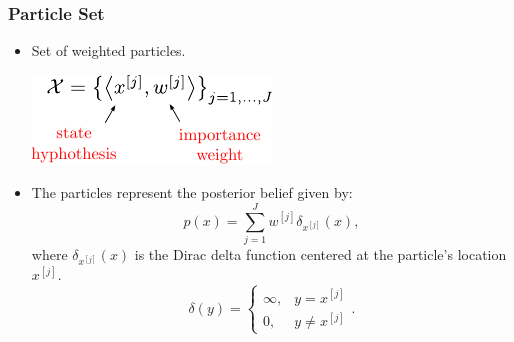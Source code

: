 \begin{frame}
    \frametitle{Particle Set}
    \begin{itemize}
        \item Set of weighted particles.
        \begin{center}
            \includegraphics[width=0.5\columnwidth]{./images/particle_filter/weighted_samples.pdf}
        \end{center}
        \item The particles represent the posterior belief given by:
        \begin{equation*}
            p(x) = \sum_{j=1}^{J} w^{[j]} \delta_{x^{[j]}}(x),
        \end{equation*}
        where $\delta_{x^{[j]}}(x)$ is the Dirac delta function centered at the particle's location $x^{[j]}$.
        \begin{equation*}
            \delta(y) = 
            \begin{cases} 
            \infty, & y = x^{[j]} \\ 
            0, & y \neq x^{[j]} 
            \end{cases}.
        \end{equation*}
    \end{itemize}
\end{frame}


